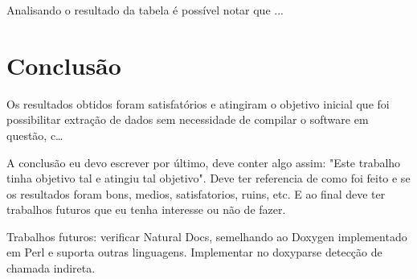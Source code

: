 Analisando o resultado da tabela é possível notar que ...

\chapter{Conclusão} \label{ch:conclusao}

Os resultados obtidos foram satisfatórios e atingiram o objetivo inicial que
foi possibilitar extração de dados sem necessidade de compilar o software em
questão, c\ldots

A conclusão eu devo escrever por último, deve conter algo assim: "Este trabalho
tinha objetivo tal e atingiu tal objetivo". Deve ter referencia de como foi
feito e se os resultados foram bons, medios, satisfatorios, ruins, etc. E ao
final deve ter trabalhos futuros que eu tenha interesse ou não de fazer.

Trabalhos futuros: verificar Natural Docs, semelhando ao Doxygen implementado
em Perl e suporta outras linguagens. Implementar no doxyparse detecção de chamada
indireta.
